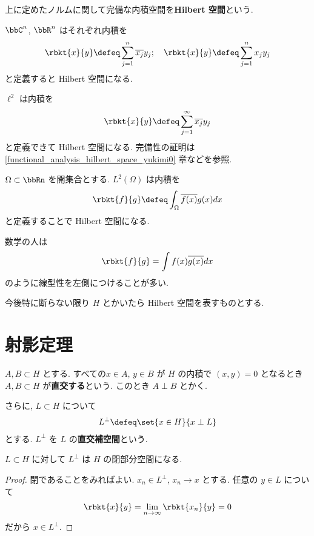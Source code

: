 \documentclass[openany, a4paper, oneside]{jsbook}
\begin{document}
\begin{defn}[Hilbert空間]
上に定めたノルムに関して完備な内積空間を\textbf{Hilbert 空間}という.
\end{defn}
\begin{ex}
$\bbC^n$, $\bbR^n$ はそれぞれ内積を
\begin{align}
 \rbkt{x}{y}
 \defeq
 \sum_{j=1}^n \overline{x_j} y_j ; \quad
 \rbkt{x}{y}
 \defeq
 \sum_{j=1}^n x_j y_j
\end{align}
と定義すると Hilbert 空間になる.
\end{ex}
\begin{ex}
$\ell^2$ は内積を
\begin{align}
 \rbkt{x}{y}
 \defeq
 \sum_{j=1}^{\infty} \overline{x_j} y_j
\end{align}
と定義できて Hilbert 空間になる.
完備性の証明は \ref{functional_analysis_hilbert_space_yukimi0} 章などを参照.
\end{ex}
\begin{ex}
$\Omega \subset \bbRn$ を開集合とする.
$L^2(\Omega)$ は内積を
\begin{align}
 \rbkt{f}{g}
 \defeq
 \int_{\Omega} \overline{f(x)} g(x) dx
\end{align}
と定義することで Hilbert 空間になる.
\end{ex}
\begin{rem}
数学の人は
\begin{align}
 \rbkt{f}{g}
 =
 \int f(x) \overline{g(x)} dx
\end{align}
のように線型性を左側につけることが多い.
\end{rem}

今後特に断らない限り $H$ とかいたら Hilbert 空間を表すものとする.
\section{射影定理}

\begin{defn}
 $A, B \subset H$ とする.
 すべての$x \in A$, $y \in B$ が $H$ の内積で $(x, y) = 0$ となるとき
 $A, B \subset H$ が\textbf{直交する}という.
 このとき $A \perp B$ とかく.

 さらに,
 $L \subset H$ について
 \begin{align}
  L^{\perp}
  \defeq
  \set{x \in H}{x \perp L}
 \end{align}
 とする.
 $L^{\perp}$ を $L$ の\textbf{直交補空間}という.
\end{defn}

\begin{prop}
 $L \subset H$ に対して $L^{\perp}$ は $H$ の閉部分空間になる.
\end{prop}
\begin{proof}
閉であることをみればよい.
$x_n \in L^{\perp}$, $x_n \to x$ とする.
任意の $y \in L$ について
\begin{align}
 \rbkt{x}{y}
 =
 \lim_{n \to \infty} \rbkt{x_n}{y}
 =
 0
\end{align}
だから $x \in L^{\perp}$.
\end{proof}
\end{document}
